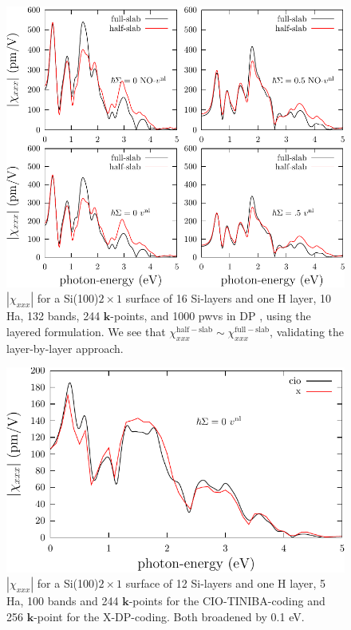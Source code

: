 \begin{figure}[b]
\centering 
\includegraphics[scale=.7]{content/figures/appendices/shg-si-2x1-16}
\caption{$|\chi_{xxx}|$ for a Si(100)$2\times 1$ surface of 16 Si-layers and one
H layer, 10 Ha, 132 bands,  244 $\mathbf{k}$-points, and 1000 pwvs in DP , using
the layered formulation. We see that $\chi^{\mathrm{half-slab}}_{xxx} \sim
\chi^{\mathrm{full-slab}}_{xxx}$, validating the layer-by-layer approach.}
\label{si-2x1}
\end{figure}

\begin{figure}[b]
\centering
\includegraphics[scale=.7]{content/figures/appendices/shg-si-2x1-n-vs-b}
\caption{$|\chi_{xxx}|$ for a Si(100)$2\times 1$ surface of 12 Si-layers and one
H layer, 5 Ha, 100 bands and 244 $\mathbf{k}$-points for the CIO-TINIBA-coding
and 256 $\mathbf{k}$-point for the X-DP-coding. Both broadened by
0.1 eV. }
\label{si-2x1-n-vs-b}
\end{figure}

